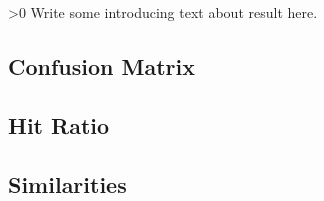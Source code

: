 \ifnum\printdraft>0
	Write some introducing text about result here.
\fi

\subsection{Confusion Matrix}

\onecolumn
\subsection{Hit Ratio}

\twocolumn
\subsection{Similarities}
